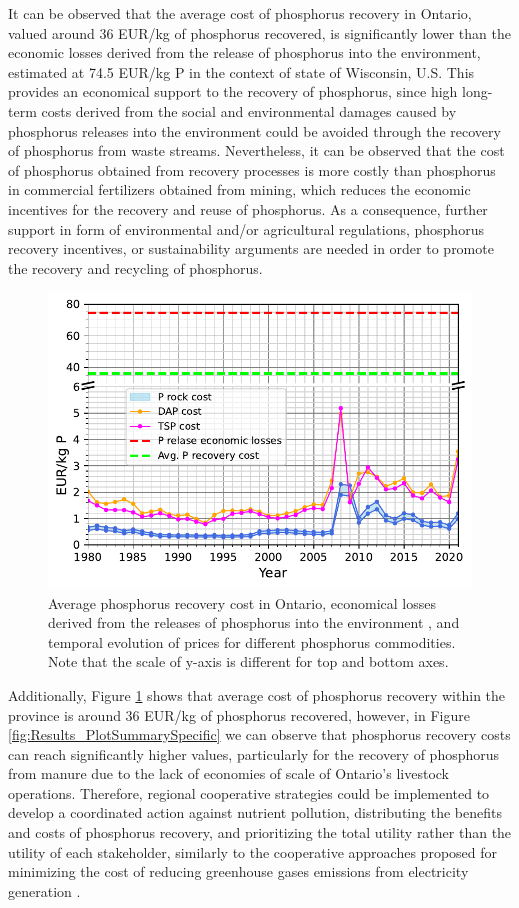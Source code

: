 \documentclass[authoryear]{elsarticle}
\begin{document}
It can be observed that the average cost of phosphorus recovery in Ontario, valued around 36 EUR/kg of phosphorus recovered, is significantly lower than the economic losses derived from the release of phosphorus into the environment, estimated at 74.5 EUR/kg P in the context of state of Wisconsin, U.S. This provides an economical support to the recovery of phosphorus, since high long-term costs derived from the social and environmental damages caused by phosphorus releases into the environment could be avoided through the recovery of phosphorus from waste streams. Nevertheless, it can be observed that the cost of phosphorus obtained from recovery processes is more costly than phosphorus in commercial fertilizers obtained from mining, which reduces the economic incentives for the recovery and reuse of phosphorus. As a consequence, further support in form of environmental and/or agricultural regulations, phosphorus recovery incentives, or sustainability arguments are needed in order to promote the recovery and recycling of phosphorus.

\begin{figure}[H]
	\centering
	\includegraphics[width=0.65\linewidth, trim={0cm 0cm 0cm 0cm},clip]{Figures/CommodityPrices.pdf} 
	\caption{Average phosphorus recovery cost in Ontario, economical losses derived from the releases of phosphorus into the environment \protect\citep{sampat2021valuing}, and temporal evolution of prices for different phosphorus commodities. Note that the scale of y-axis is different for top and bottom axes.}
	\label{fig:CommodityPrices}
\end{figure}

Additionally, Figure \ref{fig:CommodityPrices} shows that average cost of phosphorus recovery within the province is around 36 EUR/kg of phosphorus recovered, however, in Figure \ref{fig:Results_PlotSummarySpecific} we can observe that phosphorus recovery costs can reach significantly higher values, particularly for the recovery of phosphorus from manure due to the lack of economies of scale of Ontario's livestock operations. Therefore, regional cooperative strategies could be implemented to develop a coordinated action against nutrient pollution, distributing the benefits and costs of phosphorus recovery, and prioritizing the total utility rather than the utility of each stakeholder, similarly to the cooperative approaches proposed for minimizing the cost of reducing greenhouse gases emissions from electricity generation \citep{galan2018time}.
\end{document}
